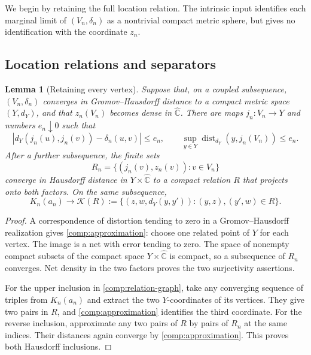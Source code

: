 \documentclass[11pt]{article}
\numberwithin{equation}{section}
\newtheorem{lemma}[theorem]{Lemma}
\theoremstyle{definition}
\theoremstyle{remark}
\newcommand{\Chat}{\widehat{\mathbb C}}
\newcommand{\1}{\mathbf 1}
\DeclareMathOperator{\dist}{dist}
\begin{document}
We begin by retaining the full location relation.  The intrinsic
input identifies each marginal limit of $(V_n,\delta_n)$ as a
nontrivial compact metric sphere, but gives no identification with
the coordinate $z_n$.

\subsection{Location relations and separators}

\begin{lemma}[Retaining every vertex]
\label{comp:relation}
Suppose that, on a coupled subsequence,
$(V_n,\delta_n)$ converges in Gromov--Hausdorff distance to a compact
metric space $(Y,d_Y)$, and that $z_n(V_n)$ becomes dense in $\Chat$.
There are maps $j_n:V_n\to Y$ and numbers $e_n\downarrow0$ such that
\begin{equation}
 \label{comp:approximation}
 \left|d_Y(j_n(u),j_n(v))-\delta_n(u,v)\right|\le e_n,
 \qquad
 \sup_{y\in Y}\dist_{d_Y}(y,j_n(V_n))\le e_n.
\end{equation}
After a further subsequence, the finite sets
\[
 R_n=\{(j_n(v),z_n(v)):v\in V_n\}
\]
converge in Hausdorff distance in $Y\times\Chat$ to a compact relation
$R$ that projects onto both factors.  On the same subsequence,
\begin{equation}
 \label{comp:relation-graph}
 K_n(a_n)\longrightarrow
 \mathcal K(R):=
 \{(z,w,d_Y(y,y')):(y,z),(y',w)\in R\}.
\end{equation}
\end{lemma}

\begin{proof}
A correspondence of distortion tending to zero in a
Gromov--Hausdorff realization gives \eqref{comp:approximation}: choose
one related point of $Y$ for each vertex.  The image is a net with
error tending to zero.  The space of nonempty compact subsets of the
compact space $Y\times\Chat$ is compact, so a subsequence of $R_n$
converges.  Net density in the two factors proves the two surjectivity
assertions.

For the upper inclusion in \eqref{comp:relation-graph}, take any
converging sequence of triples from $K_n(a_n)$ and extract the two
$Y$-coordinates of its vertices.  They give two pairs in $R$, and
\eqref{comp:approximation} identifies the third coordinate.  For the
reverse inclusion, approximate any two pairs of $R$ by pairs of $R_n$
at the same indices.  Their distances again converge by
\eqref{comp:approximation}.  This proves both Hausdorff inclusions.
\end{proof}
\end{document}

